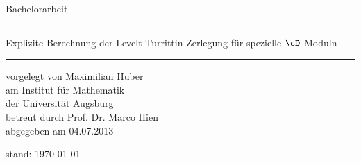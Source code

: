 \begin{titlepage}
  \thispagestyle{empty}
  \newcommand{\Rule}{%
    \textcolor{black}{\rule{\textwidth}{0.5mm}}%
  }
  \begin{center}\sffamily
    \normalfont\sffamily\large
    Bachelorarbeit
    \Rule
    \vspace{5mm}
    \Huge{Explizite Berechnung der Levelt-Turrittin-Zerlegung für spezielle
      $\cD$-Moduln}
    \vspace{1mm}
    \Rule
  \end{center}
    \normalfont\sffamily\large vorgelegt von \Large Maximilian Huber\\
    \normalfont\sffamily\large am            \Large Institut für Mathematik\\
    \normalfont\sffamily\large der           \Large Universität Augsburg\\
    \normalfont\sffamily\large betreut durch \Large Prof. Dr. Marco Hien\\
    \normalfont\sffamily\large abgegeben am  \Large 04.07.2013\\
    \vfill
    \vfill
  \ifnum{}
    \begin{center}
      \normalfont\sffamily\large stand: \today
    \end{center}
  \fi
\end{titlepage}
